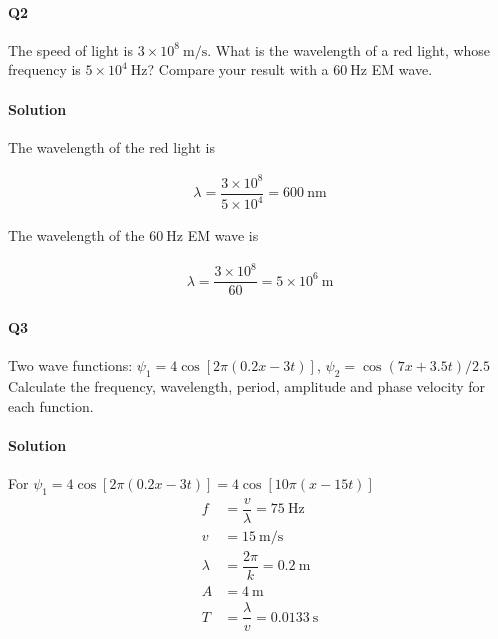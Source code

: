 \documentclass{article}
\begin{document}
\paragraph{Q2}

The speed of light is $3 \times 10^8 \ \mathrm{m/s} $. What is the wavelength of a red light, whose frequency is $5 \times 10^{4} \ \mathrm{Hz}$? Compare your result with a $60 \ \mathrm{Hz}$ EM wave.

\paragraph{Solution}

The wavelength of the red light is

\begin{equation*}
  \begin{aligned}
    \lambda = \dfrac{3 \times 10^8}{5 \times 10^{4}} = 600 \ \mathrm{nm}
  \end{aligned}
\end{equation*}

The wavelength of the $60 \ \mathrm{Hz}$ EM wave is

\begin{equation*}
  \begin{aligned}
    \lambda = \dfrac{3 \times 10^8}{60} = 5 \times 10^{6} \ \mathrm{m}
  \end{aligned}
\end{equation*}

\paragraph{Q3}

Two wave functions:
$\psi_1 = 4 \cos \left[ 2 \pi \left( 0.2 x - 3 t \right) \right]$,
$\psi_2 = \cos \left( 7 x + 3.5 t \right) / 2.5$
Calculate the frequency, wavelength, period, amplitude and phase velocity for each function.

\paragraph{Solution}
For 
$\psi_1 = 4 \cos \left[ 2 \pi \left( 0.2 x - 3 t \right) \right] = 4 \cos \left[ 10 \pi \left( x - 15 t \right) \right]$
\begin{equation*}
  \begin{aligned}
    f &= \dfrac{v}{\lambda} = 75 \ \mathrm{Hz}\\
    v &= 15 \ \mathrm{m/s} \\ 
    \lambda &= \dfrac{2\pi}{k} = 0.2 \ \mathrm{m} \\
    A &= 4 \ \mathrm{m} \\
    T &= \dfrac{\lambda}{v} = 0.0133 \ \mathrm{s}
  \end{aligned}
\end{equation*}
\end{document}
